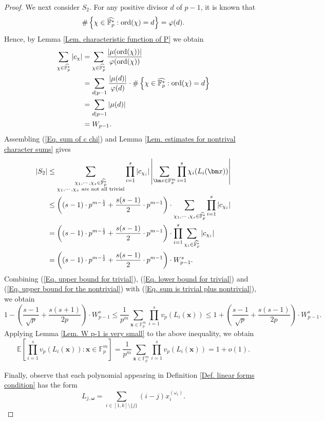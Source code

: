 \documentclass[12pt]{amsart}
\def\ord{{\rm ord}}
\def\x{{\bm x}}
\theoremstyle{plain}
\theoremstyle{remark}
\begin{document}
\begin{proof}
		We next consider $S_2$. For any positive divisor $d$ of $p-1$, it is known that
		$$\#\left\{\chi\in\widehat{\mathbb{F}_p^*}: \ord(\chi)=d\right\}=\varphi(d).$$
		Hence, by Lemma \ref{Lem. characteristic function of P} we obtain 
		\begin{align}\label{Eq. sum of c chi}
			\sum_{\chi\in\widehat{\mathbb{F}_p^*}}|c_{\chi}|
&=\sum_{\chi\in\widehat{\mathbb{F}_p^*}}\frac{|\mu(\ord(\chi))|}{\varphi(\ord(\chi))}\notag\\
&=\sum_{d\mid p-1}\frac{|\mu(d)|}{\varphi(d)}\cdot \#\left\{\chi\in\widehat{\mathbb{F}_p^*}: \ord(\chi)=d\right\}\notag\\
&=\sum_{d\mid p-1}|\mu(d)|\notag\\
&=W_{p-1}.
		\end{align}
		Assembling (\ref{Eq. sum of c chi}) and Lemma \ref{Lem. estimates for nontrival character sums} gives 
		\begin{align}\label{Eq. upper bound for the nontrivial}
	 |S_2|
&\le \sum_{\substack{\chi_1,\cdots,\chi_s\in\widehat{\mathbb{F}_p^*}\\ \chi_1,\cdots,\chi_s\ \text{are not all trivial}}}\prod_{i=1}^{s}|c_{\chi_i}| \left|\sum_{\x\in\mathbb{F}_p^m}\prod_{i=1}^{s}\chi_i(L_i(\x))\right|\notag\\
&\le \left((s-1)\cdot p^{m-\frac{1}{2}}+\frac{s(s-1)}{2}\cdot p^{m-1}\right)\cdot \sum_{\chi_1,\cdots,\chi_s\in\widehat{\mathbb{F}_p^*}}\prod_{i=1}^{s}|c_{\chi_i}|\notag\\
&=\left((s-1)\cdot p^{m-\frac{1}{2}}+\frac{s(s-1)}{2}\cdot p^{m-1}\right)\cdot \prod_{i=1}^{s}\sum_{\chi_i\in\widehat{\mathbb{F}_p^*}}|c_{\chi_i}|\notag\\
&=\left((s-1)\cdot p^{m-\frac{1}{2}}+\frac{s(s-1)}{2}\cdot p^{m-1}\right)\cdot W_{p-1}^s.
		\end{align}
	Combining (\ref{Eq. upper bound for trivial}), (\ref{Eq. lower bound for trivial}) and (\ref{Eq. upper bound for the nontrivial}) with (\ref{Eq. sum is trivial plus nontrivial}), we obtain 
	$$ 1-\left(\frac{s-1}{\sqrt{p}}+\frac{s(s+1)}{2p}\right)\cdot W_{p-1}^s
	\le \frac{1}{p^m}\sum_{\x\in\mathbb{F}_p^m}\prod_{i=1}^{s}v_p(L_i(\x))\le 1+\left(\frac{s-1}{\sqrt{p}}+\frac{s(s-1)}{2p}\right)\cdot W_{p-1}^s.$$
	Applying Lemma \ref{Lem. W p-1 is very small} to the above inequality, we obtain 
	$$\mathbb{E}\left[\prod_{i=1}^{s}v_p(L_i(\x)): \x\in\mathbb{F}_p^m\right]=\frac{1}{p^m}\sum_{\x\in\mathbb{F}_p^m}\prod_{i=1}^{s}v_p(L_i(\x))=1+o(1).$$
		
	Finally, observe that each polynomial appearing in Definition \ref{Def. linear forms condition} has the form 
	$$L_{j,{\bm{\omega}}}=\sum_{i\in[1,k]\setminus\{j\}}(i-j)x_i^{(\omega_i)}.$$
	

\end{proof}
\end{document}
